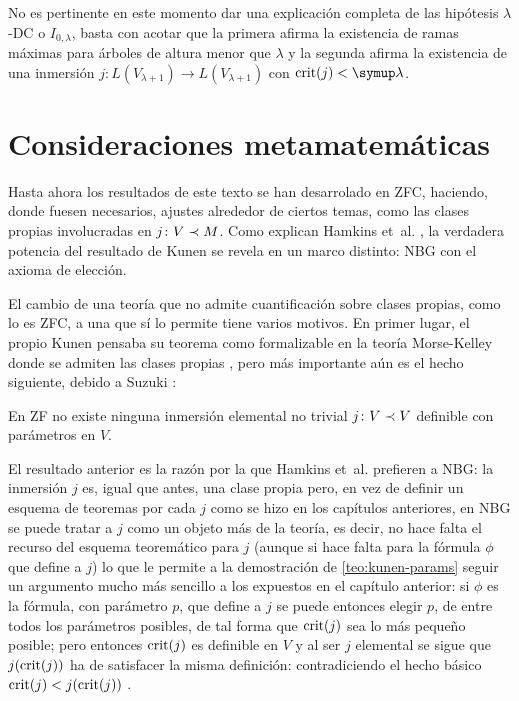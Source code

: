\documentclass
[
  12pt,
  letterpaper,
  openany,
  oneside,
]{book}
\begin{document}
No es pertinente en este momento dar una explicación completa de las hipótesis
$\lambda$-DC o $I_{0,\lambda}$, basta con acotar que la primera afirma la existencia
de ramas máximas para árboles de altura menor que $\lambda$ y la segunda afirma la existencia
de una inmersión $j\colon L(V_{\lambda+1})\to L(V_{\lambda+1})$
con $\crit{j}<\lambda$.

\section{Consideraciones metamatemáticas}

Hasta ahora los resultados de este texto se han desarrolado en ZFC,
haciendo, donde fuesen necesarios, ajustes alrededor de ciertos
temas, como las clases propias involucradas en $j\colon V\prec M$.
Como explican Hamkins et~al. \autocite{hamkins_generalizations_2012},
la verdadera potencia del resultado de Kunen se revela
en un marco distinto: NBG con el axioma de elección.

El cambio de una teoría que no admite cuantificación sobre clases propias,
como lo es ZFC, a una que sí lo permite
tiene varios motivos. En primer lugar, el propio Kunen pensaba su teorema como formalizable
en la teoría Morse-Kelley donde se admiten las clases propias \autocite[407]{kunen_elementary_1971},
pero más importante aún es el hecho siguiente, debido a Suzuki \autocite{suzuki_no_1999}:

\begin{teo}\label{teo:kunen-params}
    En ZF no existe ninguna inmersión elemental no trivial
    $j\colon V\prec V$ definible con parámetros en $V$.
\end{teo}

El resultado anterior es la razón por la que Hamkins et~al. prefieren a NBG:
la inmersión $j$ es, igual que antes, una clase propia pero, en vez de definir
un esquema de teoremas por cada $j$ como se hizo en los capítulos anteriores, en NBG
se puede tratar a $j$ como un objeto más de la teoría, es decir,
no hace falta el recurso del esquema teoremático para $j$ (aunque si hace falta
para la fórmula $\phi$ que define a $j$) lo que le permite a la demostración de \ref{teo:kunen-params}
seguir un argumento mucho más sencillo a los expuestos en el capítulo anterior:
si $\phi$ es la fórmula, con parámetro $p$, que define a $j$ se puede entonces elegir
$p$, de entre todos los parámetros posibles, de tal forma que $\operatorname{crit} (j)$ sea lo más
pequeño posible; pero entonces $\operatorname{crit} (j)$ es definible en $V$ y al ser $j$ elemental
se sigue que $j(\operatorname{crit} (j))$ ha de satisfacer la misma definición: contradiciendo el hecho
básico $\operatorname{crit} (j) < j(\operatorname{crit} (j))$ \autocite[Teorema 32]{hamkins_generalizations_2012}.
\end{document}

